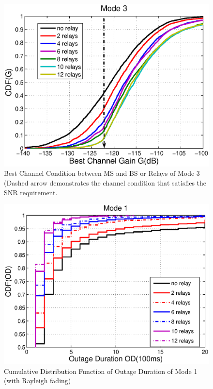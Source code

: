 \begin{figure}
\centering
\includegraphics[width=12cm]{Mode3_bestchannelgain_V2.eps}
\caption{Best Channel Condition between MS and BS or Relays of Mode 3 (Dashed arrow demonstrates the channel condition that satisfies the SNR requirement.}
\label{2:Mode3}
\end{figure}
\begin{figure}
\centering
\includegraphics[width=12cm]{OutageDuration_Rayleigh_Mode1_V2.eps}
\caption{Cumulative Distribution Function of Outage Duration of Mode 1 (with Rayleigh fading)}
\label{2:Mode1Out}
\end{figure}
